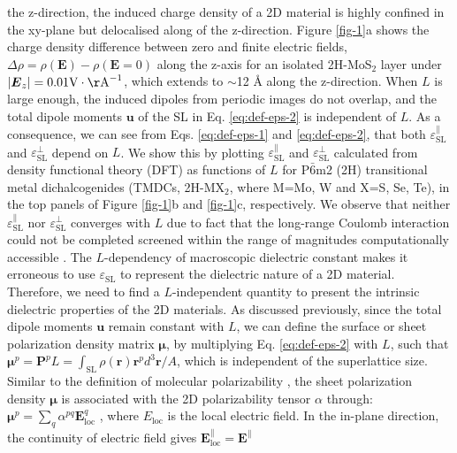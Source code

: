 \documentclass[journal=ancac3,manuscript=article,email=true,hyperref=true,keywords=false]{achemso}
\begin{document}
the z-direction, the induced charge density of a 2D material is highly
confined in the xy-plane but delocalised along of the
z-direction. Figure \ref{fig-1}a shows the charge density difference
between zero and finite electric fields,
$\Delta \rho=\rho(\boldsymbol{E}) - \rho(\boldsymbol{E}=0)$ along the
z-axis for an isolated 2H-MoS$_{2}$ layer under
$|\boldsymbol{E}_{z}|=0.01 \mathrm{V\cdot \AA}^{-1}$, which extends to
$\sim{}$12 \AA{} along the z-direction. When $L$ is large enough, the
induced dipoles from periodic images do not overlap, and the total
dipole moments $\boldsymbol{u}$ of the SL in Eq. \ref{eq:def-eps-2} is
independent of $L$. As a consequence, we can see from
Eqs. \ref{eq:def-eps-1} and \ref{eq:def-eps-2}, that both
$\varepsilon^{\parallel}_{\mathrm{SL}}$ and
$\varepsilon^{\perp}_{\mathrm{SL}}$ depend on $L$. We show this by
plotting $\varepsilon^{\parallel}_{\mathrm{SL}}$ and
$\varepsilon^{\perp}_{\mathrm{SL}}$ calculated from density functional
theory (DFT) as functions of $L$ for P$\bar{6}$m2 (2H) transitional
metal dichalcogenides (TMDCs, 2H-MX$_{2}$, where M=Mo, W and X=S, Se,
Te), in the top panels of Figure \ref{fig-1}b and \ref{fig-1}c,
respectively. We observe that neither
$\varepsilon^{\parallel}_{\mathrm{SL}}$ nor
$\varepsilon^{\perp}_{\mathrm{SL}}$ converges with $L$ due to fact
that the long-range Coulomb interaction could not be completed
screened within the range of magnitudes computationally accessible
\cite{Hueser_2013_2Dvs3D}. The $L$-dependency of macroscopic
dielectric constant makes it erroneous to use
$\varepsilon_{\mathrm{SL}}$ to represent the dielectric nature of a 2D
material. Therefore, we need to find a $L$-independent quantity to
present the intrinsic dielectric properties of the 2D materials. As
discussed previously, since the total dipole moments $\mathbf{u}$
remain constant with $L$, we can define the surface or sheet
polarization density matrix $\boldsymbol{\mu}$, by multiplying
Eq. \ref{eq:def-eps-2} with $L$, such that
$\boldsymbol{\mu}^{p} = \boldsymbol{P}^{p}L = \int_{\mathrm{SL}}
\rho(\boldsymbol{r}) \boldsymbol{r}^{p}d^{3} \boldsymbol{r}/A$, which
is independent of the superlattice size. Similar to the definition of
molecular polarizability \cite{Israelachvili_2011}, the sheet
polarization density $\boldsymbol{\mu}$ is associated with the 2D
polarizability tensor $\alpha$ through:
$\boldsymbol{\mu}^{p} = \sum_{q} \alpha^{pq}
\mathbf{E}_{\mathrm{loc}}^{q}$ \cite{T_bik_2004}, where
$E_{\mathrm{loc}}$ is the local electric field. In the in-plane
direction, the continuity of electric field gives
$\mathbf{E}^{\parallel}_{\mathrm{loc}}=\mathbf{E}^{\parallel}$
\end{document}
